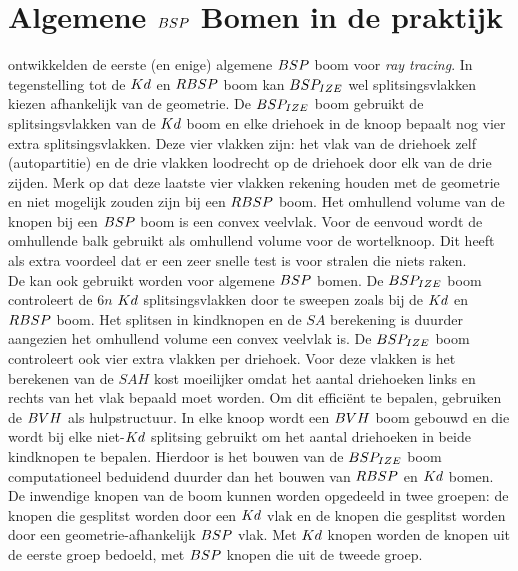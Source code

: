 \section{Algemene $BSP$ Bomen in de praktijk}
    \label{sec:h2-bspizefastkd}
    \authorIze{} \cite{ize} ontwikkelden de eerste (en enige) algemene $BSP$ boom voor \textit{ray tracing}.
    In tegenstelling tot de $Kd$ en $RBSP$ boom kan $BSP_{IZE}$ wel splitsingsvlakken kiezen afhankelijk van de geometrie.
    De $BSP_{IZE}$ boom gebruikt de splitsingsvlakken van de $Kd$ boom en elke driehoek in de knoop bepaalt nog vier extra splitsingsvlakken.
    Deze vier vlakken zijn: het vlak van de driehoek zelf (autopartitie) en de drie vlakken loodrecht op de driehoek door elk van de drie zijden.
    Merk op dat deze laatste vier vlakken rekening houden met de geometrie en niet mogelijk zouden zijn bij een $RBSP$ boom.
    Het omhullend volume van de knopen bij een $BSP$ boom is een convex veelvlak.
    Voor de eenvoud wordt de omhullende balk gebruikt als omhullend volume voor de wortelknoop.
    Dit heeft als extra voordeel dat er een zeer snelle test is voor stralen die niets raken. \\

    De \symSAH{} kan ook gebruikt worden voor algemene $BSP$ bomen. De $BSP_{IZE}$ boom controleert de $6n$ $Kd$ splitsingsvlakken door te sweepen zoals bij de $Kd$ en $RBSP$ boom. Het splitsen in kindknopen en de $SA$ berekening is duurder aangezien het omhullend volume een convex veelvlak is. 
    De $BSP_{IZE}$ boom controleert ook vier extra vlakken per driehoek. 
    Voor deze vlakken is het berekenen van de $SAH$ kost moeilijker omdat het aantal driehoeken links en rechts van het vlak bepaald moet worden. 
    Om dit efficiënt te bepalen, gebruiken \authorIze{} \cite{ize} de $BVH$ als hulpstructuur. 
    In elke knoop wordt een $BVH$ boom gebouwd en die wordt bij elke niet-$Kd$ splitsing gebruikt om het aantal driehoeken in beide kindknopen te bepalen.
    Hierdoor is het bouwen van de $BSP_{IZE}$ boom computationeel beduidend duurder dan het bouwen van $RBSP$ en $Kd$ bomen. 
    De inwendige knopen van de boom kunnen worden opgedeeld in twee groepen: de knopen die gesplitst worden door een $Kd$ vlak en de knopen die gesplitst worden door een geometrie-afhankelijk $BSP$ vlak.
    Met $Kd$ knopen worden de knopen uit de eerste groep bedoeld, met $BSP$ knopen die uit de tweede groep.\\

